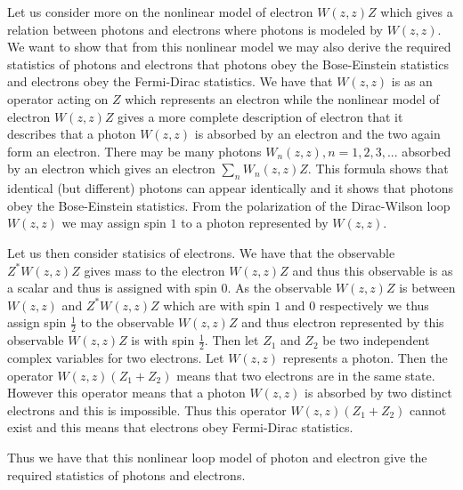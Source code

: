 \documentclass[a4paper,a4paper]{article}
\begin{document}
Let us consider more on the nonlinear model of electron $W(z,z)Z$ which gives a relation between photons and electrons where photons is modeled by $W(z,z)$. We want to show that from this nonlinear model we may also derive the required statistics of photons and electrons that photons obey the Bose-Einstein statistics and electrons obey the Fermi-Dirac statistics. We have that $W(z,z)$ is as an operator acting on $Z$ which represents an electron while the nonlinear model of electron $W(z,z)Z$ gives a more complete description of electron that it describes that a photon  $W(z,z)$ is absorbed by an electron and the two again form an electron. There may be many photons $W_n (z,z), n=1,2,3,...$ absorbed by an electron which gives an electron $\sum_n W_n (z,z)Z$. This formula shows that identical (but different) photons can appear identically and it shows that photons obey the Bose-Einstein statistics. From the polarization of the Dirac-Wilson loop $W(z,z)$ we may assign spin $1$ to a photon represented by $W(z,z)$. 

Let us then consider statisics of electrons. We have that the observable $Z^*W(z,z)Z$ gives mass to the electron $W(z,z)Z$ and thus this observable is as a scalar and thus is assigned with spin $0$. As the observable $W(z,z)Z$ is between $W(z,z)$ and $Z^*W(z,z)Z$ which are with spin $1$ and $0$ respectively we thus assign spin $\frac12$ to the observable $W(z,z)Z$ and thus electron represented by this observable $W(z,z)Z$ is with  spin $\frac12$.
Then let $Z_1$ and $Z_2$ be two independent complex variables for two electrons. Let  $W(z,z)$ represents a photon. Then the operator $W(z,z)(Z_1+Z_2)$ means that two electrons are in the same state. However this operator means that a photon $W(z,z)$ is absorbed by two distinct electrons and this is impossible. Thus this operator $W(z,z)(Z_1+Z_2)$ cannot exist and this means that electrons obey Fermi-Dirac statistics.

Thus we have that this nonlinear loop model of photon and electron give the required statistics of photons and electrons.
\end{document}
